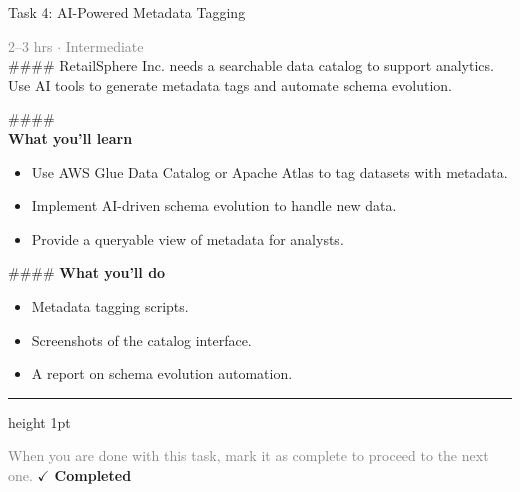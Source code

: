 \documentclass[10pt,a4paper]{article}
\begin{document}
\begin{taskbox}{Task 4: AI-Powered Metadata Tagging}

    {\small \textcolor{gray}{2--3 hrs $\cdot$ Intermediate}}\\[12pt]

    \#\#\#\#   
RetailSphere Inc. needs a searchable data catalog to support analytics. Use AI tools to generate metadata tags and automate schema evolution.

\#\#\#\# \\[10pt]
\vspace{8pt}
{\large \textbf{\textcolor{brandLight}{What you'll learn}}}\\[4pt]  
\begin{itemize}
    \item Use AWS Glue Data Catalog or Apache Atlas to tag datasets with metadata.  
    \item Implement AI-driven schema evolution to handle new data.  
    \item Provide a queryable view of metadata for analysts.  
\end{itemize}

\#\#\#\# \vspace{8pt}
{\large \textbf{\textcolor{brandLight}{What you'll do}}}\\[4pt]  
\begin{itemize}
    \item Metadata tagging scripts.  
    \item Screenshots of the catalog interface.  
    \item A report on schema evolution automation.\par
\end{itemize}

    \vspace{16pt}

    \textcolor{cardBorder}{\hrule height 1pt}\vspace{8pt}

    \small \textcolor{gray}{When you are done with this task, mark it as complete to proceed to the next one.} \hfill \textbf{\textcolor{brandDark}{$\checkmark$ Completed}}

\end{taskbox}
\end{document}
